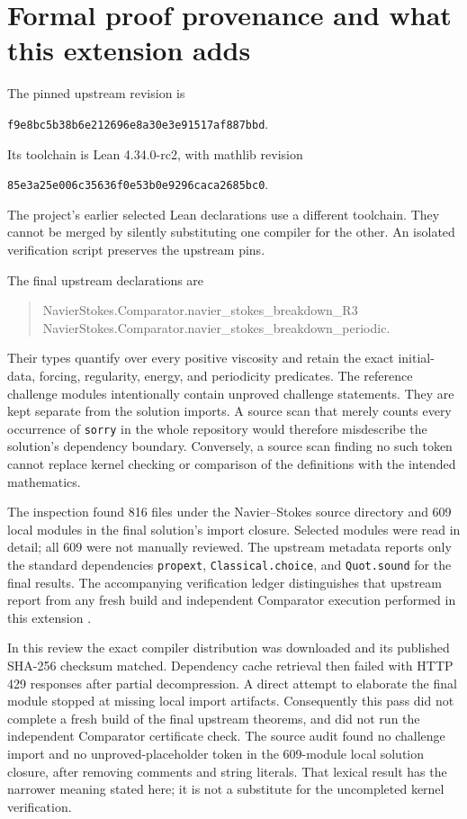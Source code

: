\section{Formal proof provenance and what this extension adds}

The pinned upstream revision is
\begin{center}\small
\texttt{f9e8bc5b38b6e212696e8a30e3e91517af887bbd}.
\end{center}
Its toolchain is Lean 4.34.0-rc2, with mathlib revision
\begin{center}\small
\texttt{85e3a25e006c35636f0e53b0e9296caca2685bc0}.
\end{center}
The project's earlier selected Lean declarations use a different toolchain.
They cannot be merged by silently substituting one compiler for the other.
An isolated verification script preserves the upstream pins.

The final upstream declarations are
\begin{quote}\small\ttfamily
NavierStokes.Comparator.navier\_stokes\_breakdown\_R3\\
NavierStokes.Comparator.navier\_stokes\_breakdown\_periodic.
\end{quote}
Their types quantify over every positive viscosity and retain the exact
initial-data, forcing, regularity, energy, and periodicity predicates.
The reference challenge modules intentionally contain unproved challenge
statements. They are kept separate from the solution imports. A source
scan that merely counts every occurrence of \texttt{sorry} in the whole
repository would therefore misdescribe the solution's dependency boundary.
Conversely, a source scan finding no such token cannot replace kernel
checking or comparison of the definitions with the intended mathematics.

The inspection found 816 files under the Navier--Stokes source directory
and 609 local modules in the final solution's import closure. Selected
modules were read in detail; all 609 were not manually reviewed. The
upstream metadata reports only the standard dependencies
\texttt{propext}, \texttt{Classical.choice}, and \texttt{Quot.sound} for
the final results. The accompanying verification ledger distinguishes
that upstream report from any fresh build and independent Comparator
execution performed in this extension \citep{NSLean2026}.

In this review the exact compiler distribution was downloaded and its
published SHA-256 checksum matched. Dependency cache retrieval then failed
with HTTP 429 responses after partial decompression. A direct attempt to
elaborate the final module stopped at missing local import artifacts.
Consequently this pass did not complete a fresh build of the final upstream
theorems, and did not run the independent Comparator certificate check.
The source audit found no challenge import and no unproved-placeholder token
in the 609-module local solution closure, after removing comments and string
literals. That lexical result has the narrower meaning stated here; it is
not a substitute for the uncompleted kernel verification.

